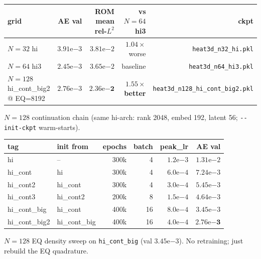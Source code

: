\begin{center}
\begin{tabular}{l r r r r}
  \textbf{grid} & \textbf{AE val} & \textbf{ROM mean rel-$L^2$} & \textbf{vs $N=64$ hi3} & \textbf{ckpt} \\
  \hline
  $N=32$  hi                    & $3.91\mathrm{e}{-3}$ & $3.81\mathrm{e}{-2}$ & $1.04\times$ worse & \texttt{heat3d\_n32\_hi.pkl} \\
  $N=64$  hi3                   & $2.45\mathrm{e}{-3}$ & $3.65\mathrm{e}{-2}$ & baseline           & \texttt{heat3d\_n64\_hi3.pkl} \\
  $N=128$ hi\_cont\_big2 @ EQ=8192 & $2.76\mathrm{e}{-3}$ & $\mathbf{2.36\mathrm{e}{-2}}$ & $\mathbf{1.55\times}$ \textbf{better} & \texttt{heat3d\_n128\_hi\_cont\_big2.pkl} \\
\end{tabular}
\end{center}

$N=128$ continuation chain (same hi-arch: rank 2048, embed 192, latent
56; \texttt{-{}-init-ckpt} warm-starts).

\begin{center}
\begin{tabular}{l l r r r r}
  \textbf{tag} & \textbf{init from} & \textbf{epochs} & \textbf{batch} & \textbf{peak\_lr} & \textbf{AE val} \\
  \hline
  hi              & --             & 300k & 4  & $1.2\mathrm{e}{-3}$ & $1.31\mathrm{e}{-2}$ \\
  hi\_cont        & hi             & 300k & 4  & $6.0\mathrm{e}{-4}$ & $7.24\mathrm{e}{-3}$ \\
  hi\_cont2       & hi\_cont       & 300k & 4  & $3.0\mathrm{e}{-4}$ & $5.45\mathrm{e}{-3}$ \\
  hi\_cont3       & hi\_cont2      & 200k & 8  & $1.5\mathrm{e}{-4}$ & $4.64\mathrm{e}{-3}$ \\
  hi\_cont\_big   & hi\_cont       & 400k & 16 & $8.0\mathrm{e}{-4}$ & $3.45\mathrm{e}{-3}$ \\
  hi\_cont\_big2  & hi\_cont\_big  & 400k & 16 & $4.0\mathrm{e}{-4}$ & $\mathbf{2.76\mathrm{e}{-3}}$ \\
\end{tabular}
\end{center}

$N=128$ EQ density sweep on \texttt{hi\_cont\_big} (val $3.45\mathrm{e}{-3}$).
No retraining; just rebuild the EQ quadrature.

